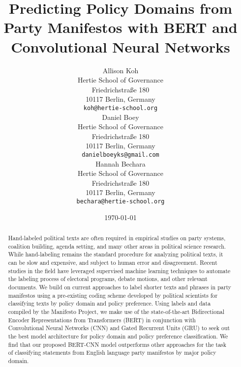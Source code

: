 \documentclass[11pt]{article}
\title{Predicting Policy Domains from Party Manifestos with BERT and Convolutional Neural Networks}
\author{Allison Koh \\
  Hertie School of Governance \\
  Friedrichstraße 180 \\
  10117 Berlin, Germany \\
  {\tt koh@hertie-school.org} \\\And
  Daniel Boey \\
  Hertie School of Governance \\
  Friedrichstraße 180 \\
  10117 Berlin, Germany \\
  {\tt danielboeyks@gmail.com} \\\And
  Hannah Bechara \\
  Hertie School of Governance \\
  Friedrichstraße 180 \\
  10117 Berlin, Germany \\
  {\tt bechara@hertie-school.org} \\}
\date{\today}
\begin{document}
\maketitle
\begin{abstract}
  Hand-labeled political texts are often required in empirical studies on party systems, coalition building, agenda setting, and many other areas in political science research. While hand-labeling remains the standard procedure for analyzing political texts, it can be slow and expensive, and subject to human error and disagreement. Recent studies in the field have leveraged supervised machine learning techniques to automate the labeling process of electoral programs, debate motions, and other relevant documents. We build on current approaches to label shorter texts and phrases in party manifestos using a pre-existing coding scheme developed by political scientists for classifying texts by policy domain and policy preference. Using labels and data compiled by the Manifesto Project, we make use of the state-of-the-art Bidirectional Encoder Representations from Transformers (BERT) in conjunction with Convolutional Neural Networks (CNN) and Gated Recurrent Units (GRU) to seek out the best model architecture for policy domain and policy preference classification. We find that our proposed BERT-CNN model outperforms other approaches for the task of classifying statements from English language party manifestos by major policy domain.
\end{abstract}
\end{document}
